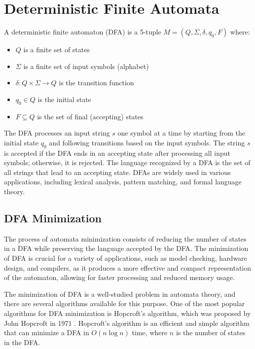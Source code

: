 \section{Deterministic Finite Automata}
\begin{definition} \label{def:dfa}
    A deterministic finite automaton (DFA) is a 5-tuple $M = (Q, \Sigma, \delta, q_0, F)$ where:
    \begin{itemize}[leftmargin=25pt]
        \item $Q$ is a finite set of states
        \item $\Sigma$ is a finite set of input symbols (alphabet)
        \item $\delta: Q \times \Sigma \rightarrow Q$ is the transition function
        \item $q_0 \in Q$ is the initial state
        \item $F \subseteq Q$ is the set of final (accepting) states
    \end{itemize}
\end{definition}

The DFA processes an input string $s$ one symbol at a time by starting from the initial state $q_0$ and following transitions based on the input symbols. The string $s$ is accepted if the DFA ends in an accepting state after processing all input symbols; otherwise, it is rejected. The language recognized by a DFA is the set of all strings that lead to an accepting state. DFAs are widely used in various applications, including lexical analysis, pattern matching, and formal language theory. 

\subsection{DFA Minimization}
The process of automata minimization consists of reducing the number of states in a DFA while preserving the language accepted by the DFA. The minimization of DFA is crucial for a variety of applications, such as model checking, hardware design, and compilers, as it produces a more effective and compact representation of the automaton, allowing for faster processing and reduced memory usage.

The minimization of DFA is a well-studied problem in automata theory, and there are several algorithms available for this purpose. One of the most popular algorithms for DFA minimization is Hopcroft's algorithm, which was proposed by John Hopcroft in 1971 \cite{HOPCROFT1971189}. Hopcroft's algorithm is an efficient and simple algorithm that can minimize a DFA in $O(n \log n)$ time, where $n$ is the number of states in the DFA.

